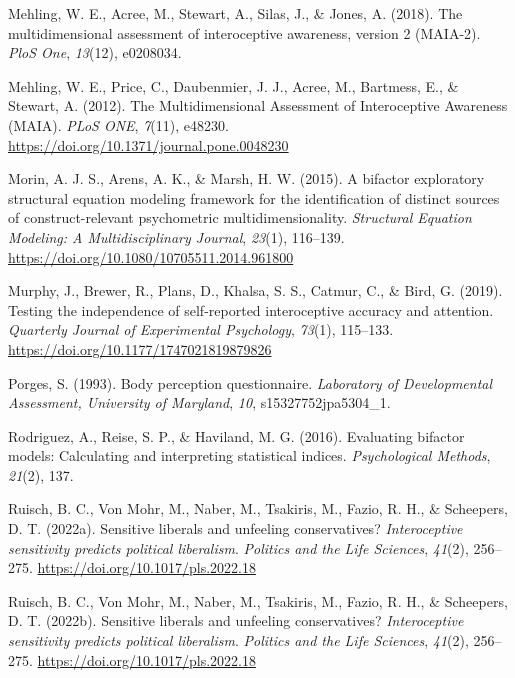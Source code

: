 \documentclass[
  man,
  floatsintext,
  longtable,
  nolmodern,
  notxfonts,
  notimes,
  colorlinks=true,linkcolor=blue,citecolor=blue,urlcolor=blue]{apa7}
\newlength{\cslhangindent}
\newenvironment{CSLReferences}[2] %
 {\begin{list}{}{%
  \setlength{\itemindent}{0pt}
  \setlength{\leftmargin}{0pt}
  \setlength{\parsep}{0pt}
  \ifodd #1
   \setlength{\leftmargin}{\cslhangindent}
   \setlength{\itemindent}{-1\cslhangindent}
  \fi
  \setlength{\itemsep}{#2\baselineskip}}}
 {\end{list}}
\begin{document}
\begin{CSLReferences}{1}{0}
Mehling, W. E., Acree, M., Stewart, A., Silas, J., \& Jones, A. (2018).
The multidimensional assessment of interoceptive awareness, version 2
(MAIA-2). \emph{PloS One}, \emph{13}(12), e0208034.

Mehling, W. E., Price, C., Daubenmier, J. J., Acree, M., Bartmess, E.,
\& Stewart, A. (2012). The Multidimensional Assessment of Interoceptive
Awareness (MAIA). \emph{PLoS ONE}, \emph{7}(11), e48230.
\url{https://doi.org/10.1371/journal.pone.0048230}

Morin, A. J. S., Arens, A. K., \& Marsh, H. W. (2015). A bifactor
exploratory structural equation modeling framework for the
identification of distinct sources of construct-relevant psychometric
multidimensionality. \emph{Structural Equation Modeling: A
Multidisciplinary Journal}, \emph{23}(1), 116--139.
\url{https://doi.org/10.1080/10705511.2014.961800}

Murphy, J., Brewer, R., Plans, D., Khalsa, S. S., Catmur, C., \& Bird,
G. (2019). Testing the independence of self-reported interoceptive
accuracy and attention. \emph{Quarterly Journal of Experimental
Psychology}, \emph{73}(1), 115--133.
\url{https://doi.org/10.1177/1747021819879826}

Porges, S. (1993). Body perception questionnaire. \emph{Laboratory of
Developmental Assessment, University of Maryland}, \emph{10},
s15327752jpa5304\_1.

Rodriguez, A., Reise, S. P., \& Haviland, M. G. (2016). Evaluating
bifactor models: Calculating and interpreting statistical indices.
\emph{Psychological Methods}, \emph{21}(2), 137.

Ruisch, B. C., Von Mohr, M., Naber, M., Tsakiris, M., Fazio, R. H., \&
Scheepers, D. T. (2022a). Sensitive liberals and unfeeling
conservatives? {\emph{Interoceptive sensitivity predicts political
liberalism}}. \emph{Politics and the Life Sciences}, \emph{41}(2),
256--275. \url{https://doi.org/10.1017/pls.2022.18}

Ruisch, B. C., Von Mohr, M., Naber, M., Tsakiris, M., Fazio, R. H., \&
Scheepers, D. T. (2022b). Sensitive liberals and unfeeling
conservatives? {\emph{Interoceptive sensitivity predicts political
liberalism}}. \emph{Politics and the Life Sciences}, \emph{41}(2),
256--275. \url{https://doi.org/10.1017/pls.2022.18}


\end{CSLReferences}
\end{document}
